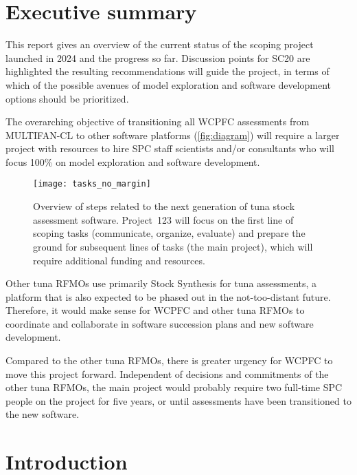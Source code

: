 \documentclass{SCreport}
\begin{document}
\wcpfctitlepage

\tableofcontents
\newpage

\section{Executive summary}

This report gives an overview of the current status of the scoping project
launched in 2024 and the progress so far. Discussion points for SC20 are
highlighted the resulting recommendations will guide the project, in terms of
which of the possible avenues of model exploration and software development
options should be prioritized.

The overarching objective of transitioning all WCPFC assessments from
MULTIFAN-CL to other software platforms (\autoref{fig:diagram}) will require a
larger project with resources to hire SPC staff scientists and/or consultants
who will focus 100\% on model exploration and software development.

\vspace{3ex}

\begin{figure}[H]
  \centering
  \texttt{[image: tasks\_no\_margin]}
  \vspace{-1ex}
  \caption{Overview of steps related to the next generation of tuna stock
    assessment software. Project~123 will focus on the first line of scoping
    tasks (communicate, organize, evaluate) and prepare the ground for
    subsequent lines of tasks (the main project), which will require additional
    funding and resources.}\label{fig:diagram}
\end{figure}

\vspace{1ex}

Other tuna RFMOs use primarily Stock Synthesis for tuna assessments, a platform
that is also expected to be phased out in the not-too-distant future. Therefore,
it would make sense for WCPFC and other tuna RFMOs to coordinate and collaborate
in software succession plans and new software development.

Compared to the other tuna RFMOs, there is greater urgency for WCPFC to move
this project forward. Independent of decisions and commitments of the other tuna
RFMOs, the main project would probably require two full-time SPC people on the
project for five years, or until assessments have been transitioned to the new
software.

\section{Introduction}
\end{document}
